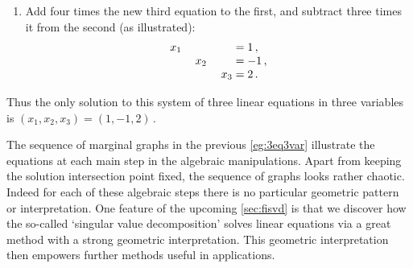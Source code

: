 \begin{example}
\begin{solution}
\begin{enumerate}
\item Add four times the new third equation to the first, and subtract three times it from the second (as illustrated):
%
\begin{equation*}
\begin{array}{r@{{}={}}l}
x_1\phantom{+x_2-4x_3}&1\,,\\
x_2\phantom{+3x_3}&-1\,,\\
x_3&2\,.
\end{array}
\end{equation*}
\end{enumerate}
Thus the only solution to this system of three linear equations in three variables is \((x_1,x_2,x_3)=(1,-1,2)\)\,.
\end{solution}
\end{example}

The sequence of marginal graphs in the previous \autoref{eg:3eq3var} illustrate the equations at each main step in the algebraic manipulations.  
Apart from keeping the solution intersection point fixed, the sequence of graphs looks rather chaotic.
Indeed for each of these algebraic steps there is no particular geometric pattern or interpretation.
One feature of the upcoming \autoref{sec:fisvd} is that we discover how the so-called `singular value decomposition' solves linear equations via a great method with a strong geometric interpretation.
This geometric interpretation then empowers further methods useful in applications.



